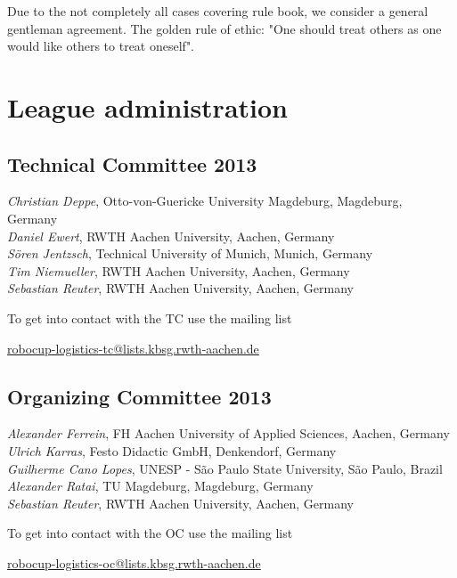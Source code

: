 \documentclass[12pt,twoside]{article}
\begin{document}
Due to the not completely all cases covering rule book, we consider a general gentleman agreement.
The golden rule of ethic: "One should treat others as one would like others to treat oneself".


\section{League administration} \label{sec:commitees}
\subsection{Technical Committee 2013} \label{sec:tc}
\emph{Christian Deppe}, Otto-von-Guericke University Magdeburg, Magdeburg,
Germany\\
\emph{Daniel Ewert}, RWTH Aachen University, Aachen, Germany\\
\emph{S\"oren Jentzsch}, Technical University of Munich, Munich, Germany\\
\emph{Tim Niemueller}, RWTH Aachen University, Aachen, Germany\\
\emph{Sebastian Reuter}, RWTH Aachen University, Aachen, Germany

\medskip

\noindent
To get into contact with the TC use the mailing list\\
\centerline{\url{robocup-logistics-tc@lists.kbsg.rwth-aachen.de}}

\subsection{Organizing Committee 2013} \label{sec:oc} 
\emph{Alexander Ferrein}, FH Aachen University of Applied Sciences,
Aachen, Germany\\
\emph{Ulrich Karras}, Festo Didactic GmbH, Denkendorf, Germany\\
\emph{Guilherme Cano Lopes}, UNESP - São Paulo State University, São Paulo,
Brazil\\
\emph{Alexander Ratai}, TU Magdeburg, Magdeburg, Germany\\
\emph{Sebastian Reuter}, RWTH Aachen University, Aachen, Germany

\medskip

\noindent
To get into contact with the OC use the mailing list\\
\centerline{\url{robocup-logistics-oc@lists.kbsg.rwth-aachen.de}}
\end{document}
